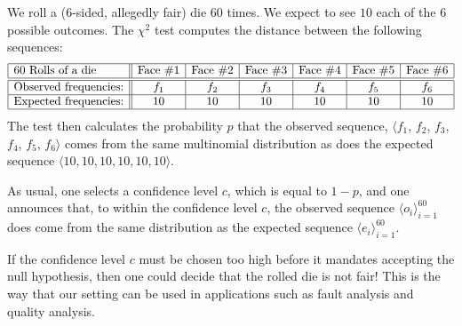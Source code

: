 We roll a ($6$-sided, allegedly fair) die $60$ times.  We expect to see $10$ each of the $6$ possible outcomes.  The $\chi^2$ test computes the distance between the following sequences:
\[ \begin{array}{|l||c|c|c|c|c|c|}
\hline
\mbox{60 Rolls of a die}  &
\mbox{Face } \#1 &
\mbox{Face } \#2 &
\mbox{Face } \#3 &
\mbox{Face } \#4 &
\mbox{Face } \#5 &
\mbox{Face } \#6 \\
\hline \hline 
\mbox{Observed frequencies:}
  & f_1 & f_2 & f_3 & f_4 & f_5 & f_6 \\
\hline
\mbox{Expected frequencies:}
  & 10 & 10 & 10 & 10 & 10 & 10 \\
\hline
\end{array}
\]
The test then calculates the probability $p$ that the observed sequence, $\langle f_1$, $f_2$, $f_3$, $f_4$, $f_5$, $f_6 \rangle$ comes from the same multinomial distribution as does the expected sequence $\langle 10, 10, 10, 10, 10, 10 \rangle$. 

\smallskip

As usual, one selects a confidence level $c$, which is equal to $1-p$, and one announces that, to within the confidence level $c$, the observed sequence $\langle o_i \rangle_{i=1}^{60}$ does come from the same distribution as the expected sequence $\langle e_i \rangle_{i=1}^{60}$.

\smallskip

If the confidence level $c$ must be chosen too high before it mandates accepting the null hypothesis, then one could decide that the rolled die is not fair!  This is the way that our setting can be used in applications such as fault analysis and quality analysis.


